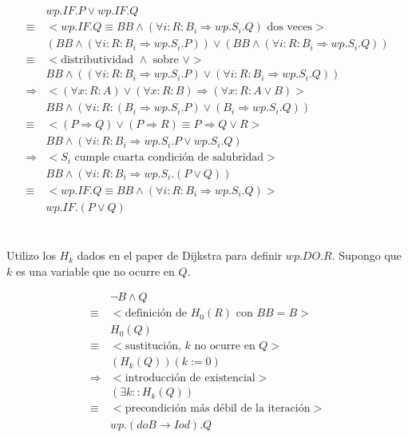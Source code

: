 \documentclass{article}
\begin{document}
\begin{align*}
 & wp.IF.P \vee wp.IF.Q \\
 \equiv & <wp.IF.Q \equiv BB \wedge (\forall i : R : B_i \Rightarrow wp.S_i.Q) \text{ dos veces}> \\
 & (BB \wedge (\forall i : R : B_i \Rightarrow wp.S_i.P)) \vee (BB \wedge (\forall i : R : B_i \Rightarrow wp.S_i.Q)) \\
 \equiv & <\text{distributividad } \wedge \text{ sobre } \vee> \\
 & BB \wedge ((\forall i : R : B_i \Rightarrow wp.S_i.P) \vee (\forall i : R : B_i \Rightarrow wp.S_i.Q)) \\
 \Rightarrow & <(\forall x : R : A) \vee (\forall x : R : B) \Rightarrow (\forall x : R : A \vee B)> \\
 & BB \wedge (\forall i : R : (B_i \Rightarrow wp.S_i.P) \vee (B_i \Rightarrow wp.S_i.Q)) \\
 \equiv & <(P \Rightarrow Q) \vee (P \Rightarrow R) \equiv P \Rightarrow Q \vee R> \\
 & BB \wedge (\forall i : R : B_i \Rightarrow wp.S_i.P \vee wp.S_i.Q) \\
 \Rightarrow & <S_i \text{ cumple cuarta condición de salubridad}> \\
 & BB \wedge (\forall i : R : B_i \Rightarrow wp.S_i.(P \vee Q)) \\
 \equiv & <wp.IF.Q \equiv BB \wedge (\forall i : R : B_i \Rightarrow wp.S_i.Q)> \\
 & wp.IF.(P \vee Q)
\end{align*}

\section{}

Utilizo los $H_k$ dados en el paper de Dijkstra para definir $wp.DO.R$. Supongo que $k$ es
una variable que no ocurre en $Q$.

\begin{align*}
 & \neg B \wedge Q \\
 \equiv & <\text{definición de } H_0(R) \text{ con } BB = B> \\
 & H_0(Q) \\
 \equiv & <\text{sustitución, } k \text{ no ocurre en } Q> \\
 & (H_k(Q))(k := 0) \\
 \Rightarrow & <\text{introducción de existencial}> \\
 & (\exists k :: H_k(Q)) \\
 \equiv & <\text{precondición más débil de la iteración}> \\
 & wp.(do B \rightarrow I od).Q \\
\end{align*}
\end{document}

